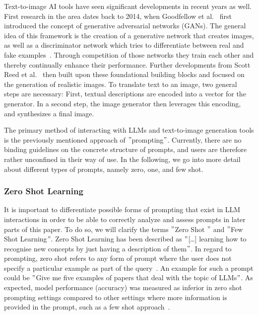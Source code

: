 Text-to-image AI tools have seen significant developments in recent years as well.
First research in the area dates back to 2014, when Goodfellow et al\(.\)~\cite{goodfellow_generative_2014,goodfellow_generative_2020}
first introduced the concept of generative adversarial networks (GANs).
The general idea of this framework is the creation of a generative network that creates
images, as well as a discriminator network which tries to differentiate between real and fake
examples~\cite{creswell_generative_2018}.
Through competition of those networks they train each other and thereby continually enhance their
performance.
Further developments from Scott Reed et al\(.\)~\cite{} then built upon these foundational
building blocks and focused on the generation of realistic images.
To translate text to an image, two general steps are necessary:
First, textual descriptions are encoded into a vector for the generator.
In a second step, the image generator then leverages this encoding, and synthesizes a final image.


The primary method of interacting with LLMs and text-to-image generation tools is the previously
mentioned approach of \("\)prompting\("\).
Currently, there are no binding guidelines on the concrete structure of prompts,
and users are therefore rather unconfined in their way of use.
In the following, we go into more detail about different types of prompts, namely zero, one, and
few shot.



\subsubsection{Zero Shot Learning} %
It is important to differentiate possible forms of prompting that exist in LLM interactions in order
to be able to correctly analyze and assess prompts in later parts of this paper.
To do so, we will clarify the terms \("\)Zero Shot \("\) and \("\)Few Shot Learning\("\).
Zero Shot Learning has been described as \("\)[\ldots] learning how to recognise
new concepts by just having a description of them\("\)\cite[p. 1]{feris_embarrassingly_2015}.
In regard to prompting, zero shot refers to any form of prompt where the user does not specify
a particular example as part of the query~\cite[p. 1]{dang_how_2022}.
An example for such a prompt could be \("\)Give me five examples of papers that deal with the topic
of LLMs\("\).
As expected, model performance (accuracy) was measured as inferior in zero shot prompting
settings compared
to other settings where more information is provided in the prompt, such as a few shot approach~\cite[p. 5]{brown_language_2020}.

